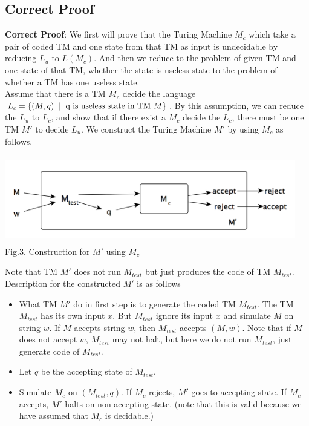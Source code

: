 \documentclass[11pt,a4paper]{article}
\newcommand{\htab}{\hspace*{0.63cm}}
\newcommand{\ba}{\hspace*{0.2cm} | \hspace*{0.2cm}}
\newcommand{\pg}{\\[0.3cm]}
\newcommand{\lu}{L_{u}}
\begin{document}
\subsection{Correct Proof}
 \textbf{Correct Proof}: We first will prove that the Turing Machine $M_{c}$ which take 
 a pair of coded TM and one state from that TM as input is undecidable by reducing $\lu$ to 
 $L(M_{c})$. And then we reduce to the problem of given TM and one state of that TM, whether 
 the state is useless state to the problem of whether a TM has one useless state. \\
 \htab Assume that there is a TM $M_{c}$ decide the language $L_{c}=\{(M,q)\ba \text{q is useless state in TM }M\}$.
 By this assumption, we can reduce the $\lu$ to $L_{c}$, and show that if there exist a $M_{c}$ decide
 the $L_{c}$, there must be one TM $M'$ to decide $\lu$. We construct the  
 Turing Machine $M'$ by using $M_{c}$ as follows.
 \begin{center}
 \includegraphics[width=5in,height=1.5in]{./TM3.png} \\
 \footnotesize Fig.3. Construction for $M'$ using $M_{c}$
 \end{center}
 \htab Note that TM $M'$ does not run $M_{test}$ but just produces the code of TM $M_{test}$. \pg
 \htab Description for the constructed $M'$ is as follows
 \begin{itemize} 
     \item{What TM $M'$ do in first step is to generate the coded TM $M_{test}$. The TM $M_{test}$ has
         its own input $x$. But $M_{test}$ ignore its input $x$ and simulate $M$ on string $w$. If 
     $M$ accepts string $w$, then $M_{test}$ accepts $(M,w)$. Note that if $M$ does not accept $w$,
 $M_{test}$ may not halt, but here we do not run $M_{test}$, just generate code of $M_{test}$.}
     \item{Let $q$ be the accepting state of $M_{test}$. }
     \item{Simulate $M_{c}$ on $(M_{test}, q)$. If $M_{c}$ rejects, $M'$ goes to accepting state. 
         If $M_{c}$ accepts, $M'$ halts on non-accepting state. (note that this is valid because
     we have assumed that $M_{c}$ is decidable.)}
 \end{itemize}
\end{document}
